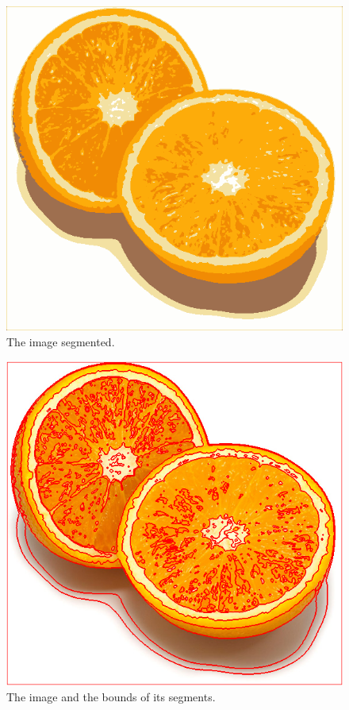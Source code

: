 \begin{figure}[H]
	\centering
  \includegraphics[scale=0.4]{./images/01/default1.png}
  \caption{The image segmented.}
	\label{fig:orange_segmented}
\end{figure}

\begin{figure}[H]
	\centering
  \includegraphics[scale=0.4]{./images/01/default2.png}
  \caption{The image and the bounds of its segments.}
  \label{fig:orange_segmented_bounds}
\end{figure}


